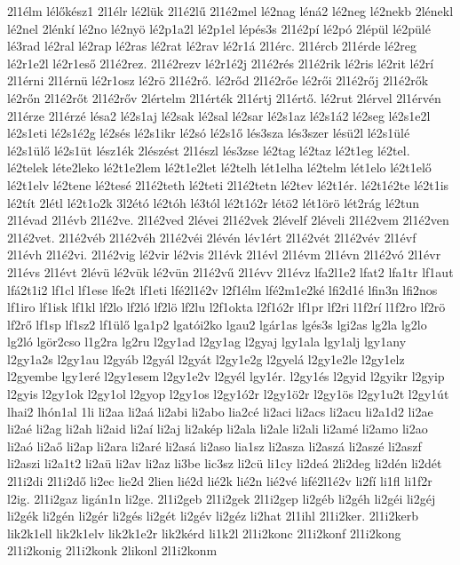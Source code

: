 {2l1élm
lélőkész1
2l1élr
lé2lük
2l1é2lű
2l1é2mel
lé2nag
léná2
lé2neg
lé2nekb
2lénekl
lé2nel
2lénkí
lé2no
lé2nyö
lé2p1a2l
lé2p1el
lépés3s
2l1é2pí
lé2pó
2lépül
lé2pülé
lé3rad
lé2ral
lé2rap
lé2ras
lé2rat
lé2rav
lé2r1á
2l1érc.
2l1ércb
2l1érde
lé2reg
lé2r1e2l
lé2r1eső
2l1é2rez.
2l1é2rezv
lé2r1é2j
2l1é2rés
2l1é2rik
lé2ris
lé2rit
lé2rí
2l1érni
2l1érnü
lé2r1osz
lé2rö
2l1é2rő.
lé2rőd
2l1é2rőe
lé2rői
2l1é2rőj
2l1é2rők
lé2rőn
2l1é2rőt
2l1é2rőv
2lértelm
2l1érték
2l1értj
2l1értő.
lé2rut
2lérvel
2l1érvén
2l1érze
2l1érzé
lésa2
lé2s1aj
lé2sak
lé2sal
lé2sar
lé2s1az
lé2s1á2
lé2seg
lé2s1e2l
lé2s1eti
lé2s1é2g
lé2sés
lé2s1ikr
lé2só
lé2s1ő
lés3sza
lés3szer
lésü2l
lé2s1ülé
lé2s1ülő
lé2s1üt
lész1ék
2lészést
2l1észl
lés3zse
lé2tag
lé2taz
lé2t1eg
lé2tel.
lé2telek
léte2leko
lé2t1e2lem
lé2t1e2let
lé2telh
lét1elha
lé2telm
lét1elo
lé2t1elő
lé2t1elv
lé2tene
lé2tesé
2l1é2teth
lé2teti
2l1é2tetn
lé2tev
lé2t1ér.
lé2t1é2te
lé2t1is
lé2tít
2létl
lé2t1o2k
3l2étó
lé2tóh
lé3tól
lé2t1ó2r
létö2
lét1örö
lét2rág
lé2tun
2l1évad
2l1évb
2l1é2ve.
2l1é2ved
2lévei
2l1é2vek
2lévelf
2léveli
2l1é2vem
2l1é2ven
2l1é2vet.
2l1é2véb
2l1é2véh
2l1é2véi
2lévén
lév1ért
2l1é2vét
2l1é2vév
2l1évf
2l1évh
2l1é2vi.
2l1é2vig
lé2vir
lé2vis
2l1évk
2l1évl
2l1évm
2l1évn
2l1é2vó
2l1évr
2l1évs
2l1évt
2lévü
lé2vük
lé2vün
2l1é2vű
2l1évv
2l1évz
lfa2l1e2
lfat2
lfa1tr
lf1aut
lfá2t1i2
lf1cl
lf1ese
lfe2t
lf1eti
lfé2l1é2v
l2f1élm
lfé2m1e2ké
lfi2d1é
lfin3n
lfi2nos
lf1iro
lf1isk
lf1kl
lf2lo
lf2ló
lf2lö
lf2lu
l2f1okta
l2f1ó2r
lf1pr
lf2ri
l1f2rí
l1f2ro
lf2rö
lf2rő
lf1sp
lf1sz2
lf1ülő
lga1p2
lgatói2ko
lgau2
lgár1as
lgés3s
lgi2as
lg2la
lg2lo
lg2ló
lgör2cso
l1g2ra
lg2ru
l2gy1ad
l2gy1ag
l2gyaj
lgy1ala
lgy1alj
lgy1any
l2gy1a2s
l2gy1au
l2gyáb
l2gyál
l2gyát
l2gy1e2g
l2gyelá
l2gy1e2le
l2gy1elz
l2gyembe
lgy1eré
l2gy1esem
l2gy1e2v
l2gyél
lgy1ér.
l2gy1és
l2gyid
l2gyikr
l2gyip
l2gyis
l2gy1ok
l2gy1ol
l2gyop
l2gy1os
l2gy1ó2r
l2gy1ö2r
l2gy1ös
l2gy1u2t
l2gy1út
lhai2
lhón1al
1li
li2aa
li2aá
li2abi
li2abo
lia2cé
li2aci
li2acs
li2acu
li2a1d2
li2ae
li2aé
li2ag
li2ah
li2aid
li2aí
li2aj
li2akép
li2ala
li2ale
li2ali
li2amé
li2amo
li2ao
li2aó
li2aő
li2ap
li2ara
li2aré
li2asá
li2aso
lia1sz
li2asza
li2aszá
li2aszé
li2aszf
li2aszi
li2a1t2
li2aü
li2av
li2az
li3be
lic3sz
li2cü
li1cy
li2deá
2li2deg
li2dén
li2dét
2l1i2di
2l1i2dő
li2ec
lie2d
2lien
lié2d
lié2k
lié2n
lié2vé
lifé2l1é2v
li2fí
li1fl
li1f2r
l2ig.
2l1i2gaz
ligán1n
li2ge.
2l1i2geb
2l1i2gek
2l1i2gep
li2géb
li2géh
li2géi
li2géj
li2gék
li2gén
li2gér
li2gés
li2gét
li2gév
li2géz
li2hat
2l1ihl
2l1i2ker.
2l1i2kerb
lik2k1ell
lik2k1elv
lik2k1e2r
lik2kérd
li1k2l
2l1i2konc
2l1i2konf
2l1i2kong
2l1i2konig
2l1i2konk
2likonl
2l1i2konm
}
